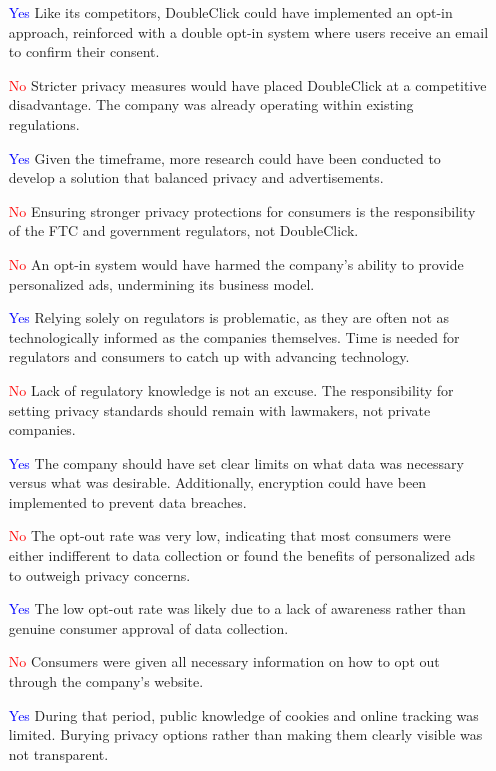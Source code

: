 \documentclass[12pt]{article}
\begin{document}
\begin{itemize}
    \item [\textcolor{blue}{Yes}] Like its competitors, DoubleClick could have implemented an opt-in approach, reinforced with a double opt-in system where users receive an email to confirm their consent.  
    \item [\textcolor{red}{No}] Stricter privacy measures would have placed DoubleClick at a competitive disadvantage. The company was already operating within existing regulations.  
    \item [\textcolor{blue}{Yes}] Given the timeframe, more research could have been conducted to develop a solution that balanced privacy and advertisements.
    \item [\textcolor{red}{No}] Ensuring stronger privacy protections for consumers is the responsibility of the FTC and government regulators, not DoubleClick.  
    \item [\textcolor{red}{No}] An opt-in system would have harmed the company’s ability to provide personalized ads, undermining its business model.  
    \item [\textcolor{blue}{Yes}] Relying solely on regulators is problematic, as they are often not as technologically informed as the companies themselves. Time is needed for regulators and consumers to catch up with advancing technology.  
    \item [\textcolor{red}{No}] Lack of regulatory knowledge is not an excuse. The responsibility for setting privacy standards should remain with lawmakers, not private companies.  
    \item [\textcolor{blue}{Yes}] The company should have set clear limits on what data was necessary versus what was desirable. Additionally, encryption could have been implemented to prevent data breaches.  
    \item [\textcolor{red}{No}] The opt-out rate was very low, indicating that most consumers were either indifferent to data collection or found the benefits of personalized ads to outweigh privacy concerns.  
    \item [\textcolor{blue}{Yes}] The low opt-out rate was likely due to a lack of awareness rather than genuine consumer approval of data collection.  
    \item [\textcolor{red}{No}] Consumers were given all necessary information on how to opt out through the company’s website.  
    \item [\textcolor{blue}{Yes}] During that period, public knowledge of cookies and online tracking was limited. Burying privacy options rather than making them clearly visible was not transparent.  

\end{itemize}
\end{document}
